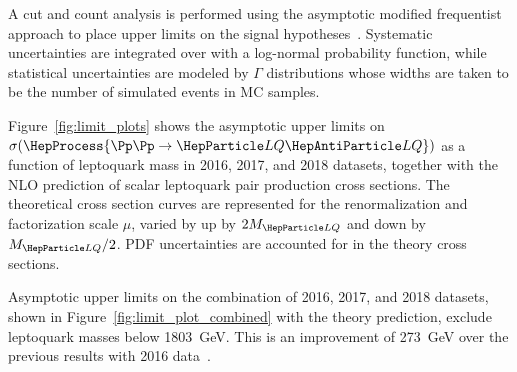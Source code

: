 A cut and count analysis is performed using the asymptotic \CLs modified frequentist approach to place upper limits on the signal hypotheses~\cite{Junk:1999kv,Read:411537:Lyons}. Systematic uncertainties are integrated over with a log-normal probability function, while statistical uncertainties are modeled by $\Gamma$ distributions whose widths are taken to be the number of simulated events in MC samples.

Figure~\ref{fig:limit_plots} shows the asymptotic upper limits on $\sigma(\HepProcess{\Pp\Pp \to \LQ\LQbar})$ as a function of leptoquark mass in 2016, 2017, and 2018 datasets, together with the NLO prediction of scalar leptoquark pair production cross sections. The theoretical cross section curves are represented for the renormalization and factorization scale $\mu$, varied by up by $2\MLQ$ and down by $\MLQ/2$. PDF uncertainties are accounted for in the theory cross sections. 

Asymptotic upper limits on the combination of 2016, 2017, and 2018 datasets, shown in Figure~\ref{fig:limit_plot_combined} with the theory prediction, exclude leptoquark masses below \SI{1803}{\GeV}. This is an improvement of \SI{273}{\GeV} over the previous results with 2016 data~\cite{CMSLQ2_2016}.

